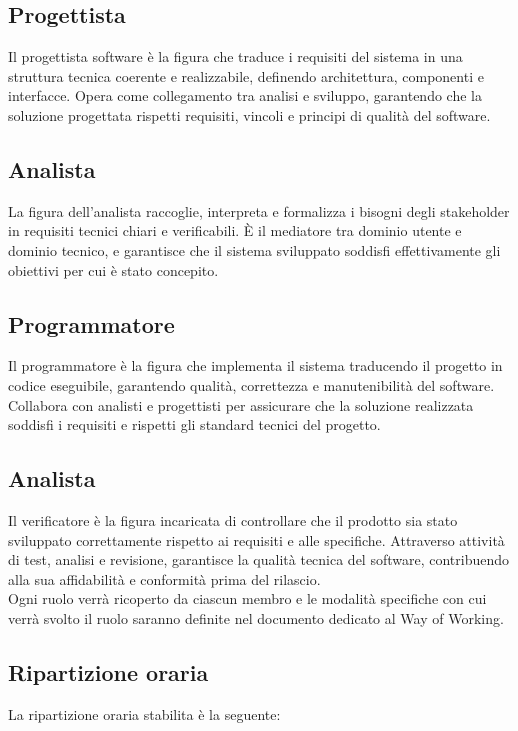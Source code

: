\documentclass[a4paper,12pt]{article}
\begin{document}
\subsection*{Progettista}
Il progettista software è la figura che traduce i requisiti del sistema in una struttura tecnica coerente e realizzabile, definendo architettura, componenti e interfacce. Opera come collegamento tra analisi e sviluppo, garantendo che la soluzione progettata rispetti requisiti, vincoli e principi di qualità del software.

\subsection*{Analista}
La figura dell'analista raccoglie, interpreta e formalizza i bisogni degli stakeholder in requisiti tecnici chiari e verificabili. È il mediatore tra dominio utente e dominio tecnico, e garantisce che il sistema sviluppato soddisfi effettivamente gli obiettivi per cui è stato concepito.

\subsection*{Programmatore}
Il programmatore è la figura che implementa il sistema traducendo il progetto in codice eseguibile, garantendo qualità, correttezza e manutenibilità del software. Collabora con analisti e progettisti per assicurare che la soluzione realizzata soddisfi i requisiti e rispetti gli standard tecnici del progetto.

\subsection*{Analista}
Il verificatore è la figura incaricata di controllare che il prodotto sia stato sviluppato correttamente rispetto ai requisiti e alle specifiche. Attraverso attività di test, analisi e revisione, garantisce la qualità tecnica del software, contribuendo alla sua affidabilità e conformità prima del rilascio.\\

\noindent Ogni ruolo verrà ricoperto da ciascun membro e le modalità specifiche con cui verrà svolto il ruolo saranno definite nel documento dedicato al Way of Working.

\newpage

\subsection{Ripartizione oraria}
La ripartizione oraria stabilita è la seguente:
\end{document}
